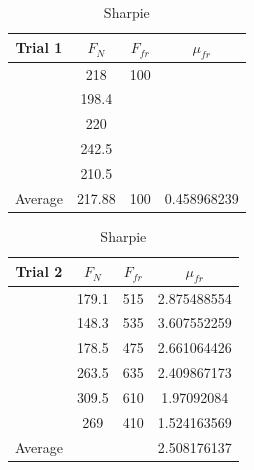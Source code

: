 \documentclass[12pt]{article}
\begin{document}
\pagebreak
\begin{table}
    \caption{Sharpie}
    \begin{tabular} {| c c c c |}
        \hline
        Trial 1 & $F_{N}$   & $F_{fr}$  & $\mu_{fr}$    \\
        \hline
                & 218       & 100       &               \\
                & 198.4     &           &               \\
                & 220       &           &               \\
                & 242.5     &           &               \\
                & 210.5     &           &               \\
        \hline
        Average & 217.88    & 100       & 0.458968239   \\
        \hline
    \end{tabular}

    \begin{tabular} {| c c c c |}
        \hline
        Trial 2 & $F_{N}$   & $F_{fr}$  & $\mu_{fr}$    \\
        \hline
                & 179.1     & 515       & 2.875488554   \\
                & 148.3     & 535       & 3.607552259   \\
                & 178.5     & 475       & 2.661064426   \\
                & 263.5     & 635       & 2.409867173   \\
                & 309.5     & 610       & 1.97092084    \\
                & 269       & 410       & 1.524163569   \\
        \hline
        Average &           &           & 2.508176137   \\
        \hline
    \end{tabular}


\end{table}
\end{document}
